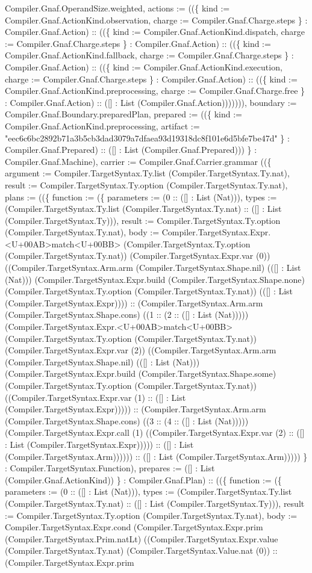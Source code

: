 \documentclass[11pt]{article}
\begin{document}
Compiler.Gnaf.OperandSize.weighted, actions := ((\{ kind := Compiler.Gnaf.ActionKind.observation, charge := Compiler.Gnaf.Charge.steps \} : Compiler.Gnaf.Action) :: ((\{ kind := Compiler.Gnaf.ActionKind.dispatch, charge := Compiler.Gnaf.Charge.steps \} : Compiler.Gnaf.Action) :: ((\{ kind := Compiler.Gnaf.ActionKind.fallback, charge := Compiler.Gnaf.Charge.steps \} : Compiler.Gnaf.Action) :: ((\{ kind := Compiler.Gnaf.ActionKind.execution, charge := Compiler.Gnaf.Charge.steps \} : Compiler.Gnaf.Action) :: ((\{ kind := Compiler.Gnaf.ActionKind.preprocessing, charge := Compiler.Gnaf.Charge.free \} : Compiler.Gnaf.Action) :: ([] : List (Compiler.Gnaf.Action))))))), boundary := Compiler.Gnaf.Boundary.preparedPlan, prepared := ((\{ kind := Compiler.Gnaf.ActionKind.preprocessing, artifact := "eec6c6bc2892b71a3b5cb3dad3079a7dfaea93d19318dc8f101e6d5bfe7be47d" \} : Compiler.Gnaf.Prepared) :: ([] : List (Compiler.Gnaf.Prepared))) \} : Compiler.Gnaf.Machine), carrier := Compiler.Gnaf.Carrier.grammar ((\{ argument := Compiler.TargetSyntax.Ty.list (Compiler.TargetSyntax.Ty.nat), result := Compiler.TargetSyntax.Ty.option (Compiler.TargetSyntax.Ty.nat), plans := ((\{ function := (\{ parameters := (0 :: ([] : List (Nat))), types := (Compiler.TargetSyntax.Ty.list (Compiler.TargetSyntax.Ty.nat) :: ([] : List (Compiler.TargetSyntax.Ty))), result := Compiler.TargetSyntax.Ty.option (Compiler.TargetSyntax.Ty.nat), body := Compiler.TargetSyntax.Expr.<U+00AB>match<U+00BB> (Compiler.TargetSyntax.Ty.option (Compiler.TargetSyntax.Ty.nat)) (Compiler.TargetSyntax.Expr.var (0)) ((Compiler.TargetSyntax.Arm.arm (Compiler.TargetSyntax.Shape.nil) (([] : List (Nat))) (Compiler.TargetSyntax.Expr.build (Compiler.TargetSyntax.Shape.none) (Compiler.TargetSyntax.Ty.option (Compiler.TargetSyntax.Ty.nat)) (([] : List (Compiler.TargetSyntax.Expr)))) :: (Compiler.TargetSyntax.Arm.arm (Compiler.TargetSyntax.Shape.cons) ((1 :: (2 :: ([] : List (Nat))))) (Compiler.TargetSyntax.Expr.<U+00AB>match<U+00BB> (Compiler.TargetSyntax.Ty.option (Compiler.TargetSyntax.Ty.nat)) (Compiler.TargetSyntax.Expr.var (2)) ((Compiler.TargetSyntax.Arm.arm (Compiler.TargetSyntax.Shape.nil) (([] : List (Nat))) (Compiler.TargetSyntax.Expr.build (Compiler.TargetSyntax.Shape.some) (Compiler.TargetSyntax.Ty.option (Compiler.TargetSyntax.Ty.nat)) ((Compiler.TargetSyntax.Expr.var (1) :: ([] : List (Compiler.TargetSyntax.Expr))))) :: (Compiler.TargetSyntax.Arm.arm (Compiler.TargetSyntax.Shape.cons) ((3 :: (4 :: ([] : List (Nat))))) (Compiler.TargetSyntax.Expr.call (1) ((Compiler.TargetSyntax.Expr.var (2) :: ([] : List (Compiler.TargetSyntax.Expr))))) :: ([] : List (Compiler.TargetSyntax.Arm)))))) :: ([] : List (Compiler.TargetSyntax.Arm))))) \} : Compiler.TargetSyntax.Function), prepares := ([] : List (Compiler.Gnaf.ActionKind)) \} : Compiler.Gnaf.Plan) :: ((\{ function := (\{ parameters := (0 :: ([] : List (Nat))), types := (Compiler.TargetSyntax.Ty.list (Compiler.TargetSyntax.Ty.nat) :: ([] : List (Compiler.TargetSyntax.Ty))), result := Compiler.TargetSyntax.Ty.option (Compiler.TargetSyntax.Ty.nat), body := Compiler.TargetSyntax.Expr.cond (Compiler.TargetSyntax.Expr.prim (Compiler.TargetSyntax.Prim.natLt) ((Compiler.TargetSyntax.Expr.value (Compiler.TargetSyntax.Ty.nat) (Compiler.TargetSyntax.Value.nat (0)) :: (Compiler.TargetSyntax.Expr.prim 
\end{document}
